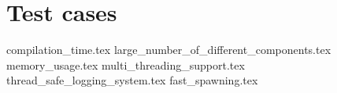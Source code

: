 \section{Test cases}

{compilation_time.tex}
{large_number_of_different_components.tex}
{memory_usage.tex}
{multi_threading_support.tex}
{thread_safe_logging_system.tex}
{fast_spawning.tex}